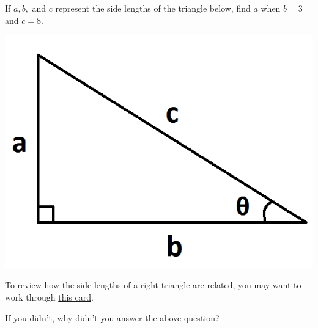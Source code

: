 \documentclass{ximera}
\begin{document}
\begin{problem} 

\begin{problem}
    
    If $a, b,$ and $c$ represent the side lengths of the triangle below, find $a$ when $b = 3$ and $c = 8$.
    
\begin{center} \includegraphics[scale=0.5]{Triangle.png} \end{center}
    
    \begin{hint}
    To review how the side lengths of a right triangle are related, you may want to work through \href{https://ximera.osu.edu/math160fa17/m160prerequisites/prerequisiteVideos/trigUnitCircle}{this card}.
    \end{hint}

  \begin{multipleChoice}

      
  \end{multipleChoice}
  
\end{problem}

\begin{question}
  
    If you didn't, why didn't you answer the above question?
  
  \begin{multipleChoice}
      

  \end{multipleChoice}
  
\end{question}

\end{problem}
\end{document}
